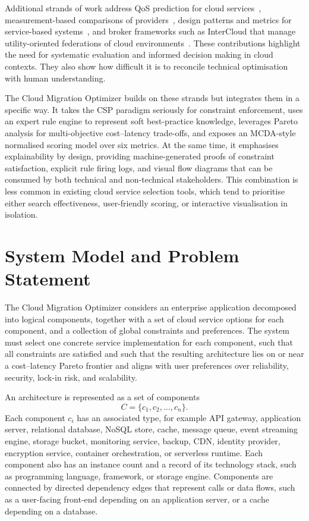 \documentclass[journal]{IEEEtran}
\begin{document}
Additional strands of work address QoS prediction for cloud
services~\cite{han_qos}, measurement-based comparisons of
providers~\cite{leitner_service,li_cloudcmp}, design patterns and metrics for service-based
systems~\cite{morasca_measuring}, and broker frameworks such as InterCloud that
manage utility-oriented federations of cloud
environments~\cite{buyya_intercloud}. These contributions highlight the need for
systematic evaluation and informed decision making in cloud contexts. They also
show how difficult it is to reconcile technical optimisation with human
understanding.

The Cloud Migration Optimizer builds on these strands but integrates them in a
specific way. It takes the CSP paradigm seriously for constraint enforcement,
uses an expert rule engine to represent soft best-practice knowledge, leverages
Pareto analysis for multi-objective cost--latency trade-offs, and exposes an
MCDA-style normalised scoring model over six metrics. At the same time, it
emphasises explainability by design, providing machine-generated proofs of
constraint satisfaction, explicit rule firing logs, and visual flow diagrams
that can be consumed by both technical and non-technical stakeholders. This
combination is less common in existing cloud service selection tools, which tend
to prioritise either search effectiveness, user-friendly scoring, or interactive
visualisation in isolation.

\section{System Model and Problem Statement}
\label{sec:model}

The Cloud Migration Optimizer considers an enterprise application decomposed
into logical components, together with a set of cloud service options for each
component, and a collection of global constraints and preferences. The system
must select one concrete service implementation for each component, such that
all constraints are satisfied and such that the resulting architecture lies on
or near a cost--latency Pareto frontier and aligns with user preferences over
reliability, security, lock-in risk, and scalability.

An architecture is represented as a set of components
\begin{equation}
  C = \{c_1, c_2, \ldots, c_n\}.  \label{eq:components}
\end{equation}
Each component $c_i$ has an associated type, for example API gateway,
application server, relational database, NoSQL store, cache, message queue,
event streaming engine, storage bucket, monitoring service, backup, CDN,
identity provider, encryption service, container orchestration, or serverless
runtime. Each component also has an instance count and a record of its
technology stack, such as programming language, framework, or storage engine.
Components are connected by directed dependency edges that represent calls or
data flows, such as a user-facing front-end depending on an application server,
or a cache depending on a database.
\end{document}
